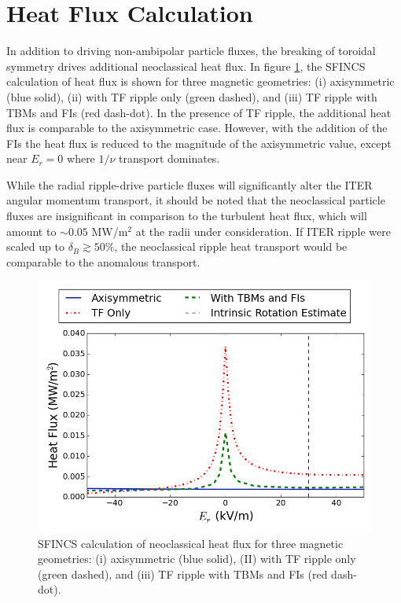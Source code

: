 \documentclass{article}
\begin{document}
\FloatBarrier

\section{Heat Flux Calculation}

In addition to driving non-ambipolar particle fluxes, the breaking of toroidal symmetry drives additional neoclassical heat flux. In figure \ref{fig:HeatFlux}, the SFINCS calculation of heat flux is shown for three magnetic geometries: (i) axisymmetric (blue solid), (ii) with TF ripple only (green dashed), and (iii) TF ripple with TBMs and FIs (red dash-dot). In the presence of TF ripple, the additional heat flux is comparable to the axisymmetric case. However, with the addition of the FIs the heat flux is reduced to the magnitude of the axisymmetric value, except near $E_r = 0$ where $1/\nu$ transport dominates. 

While the radial ripple-drive particle fluxes will significantly alter the ITER angular momentum transport, it should be noted that the neoclassical particle fluxes are insignificant in comparison to the turbulent heat flux, which will amount to $\sim 0.05$ MW/m$^2$ at the radii under consideration. If ITER ripple were scaled up to $\delta_B \gtrsim 50\%$, the neoclassical ripple heat transport would be comparable to the anomalous transport.

\begin{figure}[h!]
\centering
\includegraphics[width=1\textwidth]
{HeatFlux.png}
\caption{\label{fig:HeatFlux} SFINCS calculation of neoclassical heat flux for three magnetic geometries: (i) axisymmetric (blue solid), (II) with TF ripple only (green dashed), and (iii) TF ripple with TBMs and FIs (red dash-dot).}
\end{figure}
\end{document}
